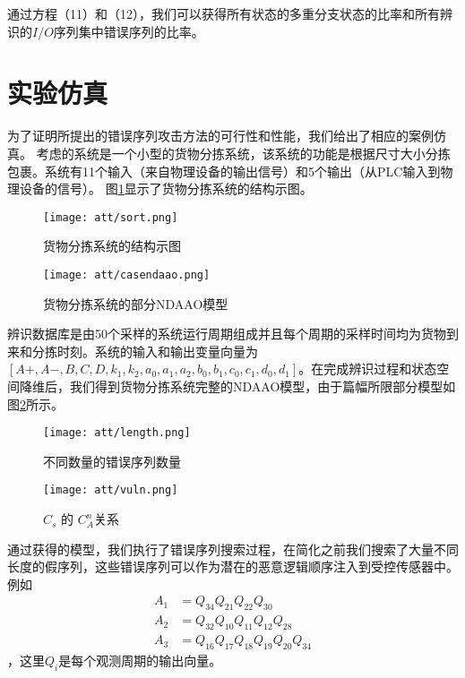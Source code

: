 通过方程（11）和（12），我们可以获得所有状态的多重分支状态的比率和所有辨识的$I/O$序列集中错误序列的比率。
\section{实验仿真}
\label{sec:simulation}

为了证明所提出的错误序列攻击方法的可行性和性能，我们给出了相应的案例仿真。 考虑的系统是一个小型的货物分拣系统，该系统的功能是根据尺寸大小分拣包裹。系统有11个输入（来自物理设备的输出信号）和5个输出（从PLC输入到物理设备的信号）。 图\ref{fig7}显示了货物分拣系统的结构示图。
\begin{figure}[!htb]
  \centering
  \texttt{[image: att/sort.png]}
  \caption{货物分拣系统的结构示图}
  \label{fig7}
\end{figure}

\begin{figure}[!htb]
  \centering
  \texttt{[image: att/casendaao.png]}
  \caption{货物分拣系统的部分NDAAO模型}
  \label{fig8}
\end{figure}


辨识数据库是由50个采样的系统运行周期组成并且每个周期的采样时间均为货物到来和分拣时刻。系统的输入和输出变量向量为$[A+,A-,B,C,D,k_1,k_2,a_0,a_1,a_2,b_0,b_1,c_0,c_1,d_0,d_1]$。在完成辨识过程和状态空间降维后，我们得到货物分拣系统完整的NDAAO模型，由于篇幅所限部分模型如图\ref{fig8}所示。
\begin{figure}[!htb]
  \centering
  \texttt{[image: att/length.png]}
  \caption{不同数量的错误序列数量}
  \label{fig9}
\end{figure}

\begin{figure}[!htb]
  \centering
  \texttt{[image: att/vuln.png]}
  \caption{$C_s$ 的 $C_A^n$关系}
  \label{fig10}
\end{figure}

通过获得的模型，我们执行了错误序列搜索过程，在简化之前我们搜索了大量不同长度的假序列，这些错误序列可以作为潜在的恶意逻辑顺序注入到受控传感器中。例如\[\begin{split} A_1&=Q_{34}Q_{21}Q_{22}Q_{30}\\A_2&=Q_{32}Q_{10}Q_{11}Q_{12}Q_{28}\\A_3&=Q_{16}Q_{17}Q_{18}Q_{19}Q_{20}Q_{34} \end{split}\]，这里$Q_i$是每个观测周期的输出向量。\\

